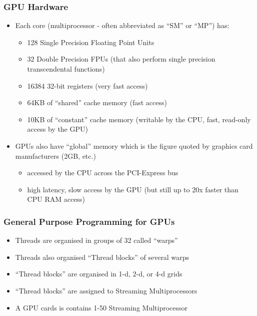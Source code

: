 \subsubsection{GPU Hardware}\label{gpu-hardware}

\begin{itemize}
\itemsep1pt\parskip0pt
\item
  Each core (multiprocessor - often abbreviated as ``SM'' or ``MP'')
  has:

  \begin{itemize}
  \itemsep1pt\parskip0pt
  \item
    128 Single Precision Floating Point Units
  \item
    32 Double Precision FPUs (that also perform single precision
    transcendental functions)
  \item
    16384 32-bit registers (very fast access)
  \item
    64KB of ``shared'' cache memory (fast access)
  \item
    10KB of ``constant'' cache memory (writable by the CPU, fast,
    read-only access by the GPU)
  \end{itemize}
\item
  GPUs also have ``global'' memory which is the figure quoted by
  graphics card manufacturers (2GB, etc.)

  \begin{itemize}
  \itemsep1pt\parskip0pt
  \item
    accessed by the CPU across the PCI-Express bus
  \item
    high latency, slow access by the GPU (but still up to 20x faster
    than CPU RAM access)
  \end{itemize}
\end{itemize}

\subsubsection{General Purpose Programming for
GPUs}\label{general-purpose-programming-for-gpus}

\begin{itemize}
\itemsep1pt\parskip0pt
\item
  Threads are organised in groups of 32 called ``warps''
\item
  Threads also organised ``Thread blocks'' of several warps
\item
  ``Thread blocks'' are organised in 1-d, 2-d, or 4-d grids
\item
  ``Thread blocks'' are assigned to Streaming Multiprocessors
\item
  A GPU cards is contains 1-50 Streaming Multiprocessor
\end{itemize}

